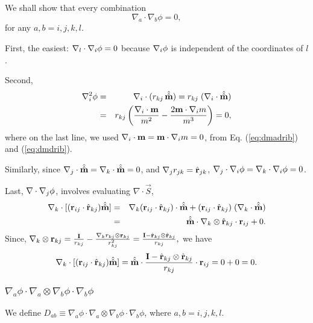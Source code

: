 \documentclass{article}
\begin{document}
We shall show that every combination
\begin{equation} 
\nabla_a \cdot \nabla_b \phi = 0,
\end{equation}
for any $a, b = i, j, k, l$.

First, the easiest: $\nabla_l \cdot \nabla_i \phi = 0$
because $\nabla_i \phi$ is independent of the coordinates of $l$.


Second,
\begin{eqnarray*}
\nabla_i^2 \phi   
&=& \nabla_i \cdot (r_{kj} \, \hat{\hat{\mathbf{m}}}) 
 =  r_{kj} \; ( \nabla_i \cdot \hat{\hat{\mathbf{m}}} ) \\
&=& r_{kj} 
  \left(
    \frac {\nabla_i \cdot \mathbf{m}} {m^2} 
    - \frac {2 \mathbf{m} \cdot \nabla_i m} {m^3}
  \right) = 0,
\end{eqnarray*}
where on the last line, we used
$\nabla_i \cdot \mathbf{m} = \mathbf{m} \cdot \nabla_i m = 0$,
from Eq. (\ref{eq:dmadrib}) and (\ref{eq:dmdrib}).


Similarly, since
$\nabla_j \cdot \hat{\hat{\mathbf{m}}} = \nabla_k \cdot \hat{\hat{\mathbf{m}}} = 0$,
and
$\nabla_j r_{jk} = \hat{\mathbf{r}}_{jk}$,
%
$\nabla_j \cdot \nabla_i \phi = \nabla_k \cdot \nabla_i \phi = 0$.
%



Last, $\nabla \cdot \nabla_j \phi$, involves evaluating $\nabla \cdot \vec S$,
\begin{eqnarray*}
\nabla_k \cdot [ ( \mathbf{r}_{ij} \cdot \hat{\mathbf{r}}_{kj}) \hat{\hat{\mathbf{m}}}]
&=& 
\nabla_k ( \mathbf{r}_{ij} \cdot \hat{\mathbf{r}}_{kj}) \cdot \hat{\hat{\mathbf{m}}}
+
( \mathbf{r}_{ij} \cdot \hat{\mathbf{r}}_{kj}) \; (\nabla_k \cdot \hat{\hat{\mathbf{m}}}) \\
&=& 
\hat{\hat{\mathbf{m}}} \cdot \nabla_k \otimes \hat{\mathbf{r}}_{kj} \cdot \mathbf{r}_{ij}
+ 0.
\end{eqnarray*}
%
Since,
$ \nabla_k \otimes \mathbf{r}_{kj} 
= \frac {\mathbf I} { r_{kj}}
- \frac { \nabla_k r_{kj} \otimes \mathbf{r}_{kj} }{ r_{kj}^2} 
= \frac { {\mathbf I - \hat{\mathbf{r}}_{kj} \otimes \hat{\mathbf{r}}_{kj}} } { r_{kj}},$
%
we have
\begin{eqnarray*}
\nabla_k \cdot [ ( \mathbf{r}_{ij} \cdot \hat{\mathbf{r}}_{kj}) \hat{\hat{\mathbf{m}}}]
=
\hat{\hat{\mathbf{m}}} \cdot \frac { {\mathbf I - \hat{\mathbf{r}}_{kj} \otimes \hat{\mathbf{r}}_{kj}} } { r_{kj}} \cdot \mathbf{r}_{ij} 
= 0 + 0 = 0.
\end{eqnarray*}



\subsubsection{$\nabla_a \phi \cdot \nabla_a \otimes \nabla_b \phi \cdot \nabla_b \phi$}
We define 
$D_{ab} \equiv \nabla_a \phi \cdot \nabla_a \otimes \nabla_b \phi \cdot \nabla_b \phi$, 
where $a, b = i, j, k, l$.
\end{document}

